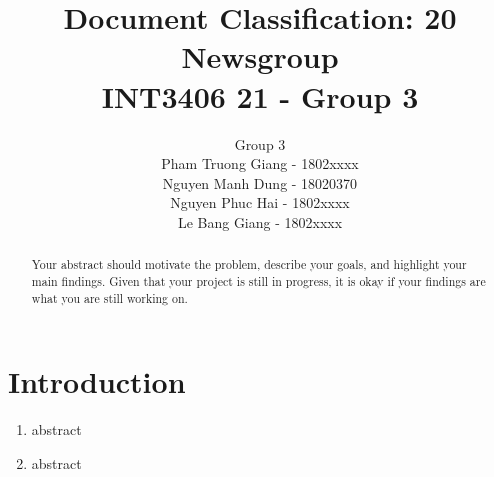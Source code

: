 \documentclass{article}
\title{
  Document Classification: 20 Newsgroup
  \vspace{.35cm} \\
  \Large{\normalfont INT3406 21 - Group 3} 
}
\author{
  \large Group 3
  \vspace{.1cm} \\
  Pham Truong Giang - 1802xxxx\\
  Nguyen Manh Dung - 18020370\\
  Nguyen Phuc Hai - 1802xxxx\\
  Le Bang Giang - 1802xxxx\\
}
\begin{document}
\maketitle

\begin{abstract}
  Your abstract should motivate the problem, describe your goals, 
  and highlight your main findings. Given that your project is still in progress, it is okay if your findings are what you are still working on.
\end{abstract}


\section{Introduction}

\begin{enumerate}[label=1.\arabic*]
    \item abstract
    \item abstract
\end{enumerate}
\end{document}
